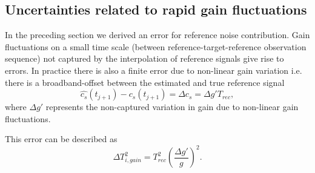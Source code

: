 \subsection{Uncertainties related to rapid gain fluctuations}
\label{sec:gainvar}
In the preceding section we derived an error for reference noise contribution.
%
Gain fluctuations on a small time scale (between reference-target-reference
observation sequence) not captured by the interpolation of reference signals
give rise to errors.
In practice there is also a finite error due to non-linear gain variation 
i.e. there is a broadband-offset between the estimated and true reference signal
\begin{equation}
\hat{c_{s}}(t_{j+1}) - c_{s}(t_{j+1}) = \Delta c_{s} = \Delta g' T_{rec},
\end{equation}
where \(\Delta g'\) represents the non-captured variation in gain
due to non-linear gain fluctuations.

This error can be described as
\begin{equation}
\Delta T_{i,gain}^2 = T_{rec}^{2}\left(\frac{\Delta g'}{g}\right)^{2}.
\label{eq:gainvar}
\end{equation}

